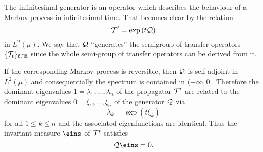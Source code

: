The infinitesimal generator is an operator which describes the behaviour of a Markov process in infinitesimal time. That becomes clear by the relation
\begin{equation*}
\mathcal{T}^t = \exp{(t \mathcal{Q})}
\end{equation*}
in $L^2(\mu)$.  We say that $\mathcal{Q}$ ``generates'' the semigroup of transfer operators $\{\mathcal{T}_t\}_{t \in \mathbb{R}}$ since the whole semi-group of transfer operators can be derived from it.

If the corresponding Markov process is reversible, then $\mathcal{Q}$ is self-adjoint in $L^2(\mu)$ and consequentially the spectrum is contained in $(-\infty,0]$.
Therefore the dominant eigenvalues $1 = \lambda_1,\dots,\lambda_n$ of the propagator $\mathcal{T}^t$ are related to the dominant eigenvalues $0 = \xi_1,\dots,\xi_n$ of the generator $\mathcal{Q}$ via %
\begin{equation*}
	\lambda_k = \exp(t\xi_k)
\end{equation*}
for all $1\leq k \leq n$ and the associated eigenfunctions are identical. Thus the invariant measure $\eins$ of $\mathcal{T}^t$ satisfies %
\begin{equation*}
	\Qcal\eins = 0.
\end{equation*}